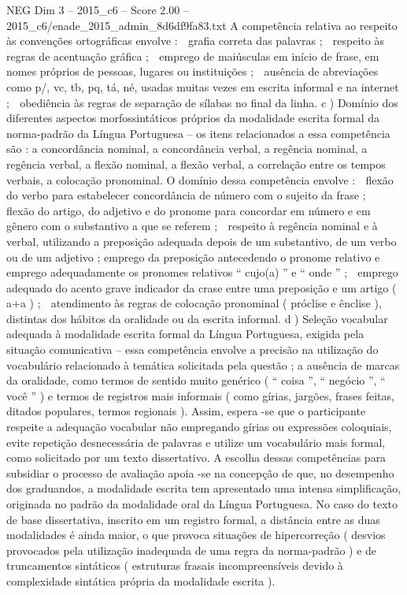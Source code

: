 \begin{textsample}{NEG Dim 3 – 2015\_c6 – Score 2.00 – 2015\_c6/enade\_2015\_admin\_8d6df9fa83.txt}
A competência relativa ao respeito às convenções ortográficas envolve :  grafia correta das palavras ;  respeito às regras de acentuação gráfica ;  emprego de maiúsculas em início de frase, em nomes próprios de pessoas, lugares ou instituições ;  ausência de abreviações como p/, vc, tb, pq, tá, né, usadas muitas vezes em escrita informal e na internet ;  obediência às regras de separação de sílabas no final da linha. c ) Domínio dos diferentes aspectos morfossintáticos próprios da modalidade escrita formal da norma-padrão da Língua Portuguesa – os itens relacionados a essa competência são : a concordância nominal, a concordância verbal, a regência nominal, a regência verbal, a flexão nominal, a flexão verbal, a correlação entre os tempos verbais, a colocação pronominal.
O domínio dessa competência envolve :  flexão do verbo para estabelecer concordância de número com o sujeito da frase ;  flexão do artigo, do adjetivo e do pronome para concordar em número e em gênero com o substantivo a que se referem ;  respeito à regência nominal e à verbal, utilizando a preposição adequada depois de um substantivo, de um verbo ou de um adjetivo ; emprego da preposição antecedendo o pronome relativo e emprego adequadamente os pronomes relativos “ cujo(a) ” e “ onde ” ;  emprego adequado do acento grave indicador da crase entre uma preposição e um artigo ( a+a ) ;  atendimento às regras de colocação pronominal ( próclise e ênclise ), distintas dos hábitos da oralidade ou da escrita informal. d ) Seleção vocabular adequada à modalidade escrita formal da Língua Portuguesa, exigida pela situação comunicativa – essa competência envolve a precisão na utilização do vocabulário relacionado à temática solicitada pela questão ; a ausência de marcas da oralidade, como termos de sentido muito genérico ( “ coisa ”, “ negócio ”, “ você ” ) e termos de registros mais informais ( como gírias, jargões, frases feitas, ditados populares, termos regionais ).
Assim, espera -se que o participante respeite a adequação vocabular não empregando gírias ou expressões coloquiais, evite repetição desnecessária de palavras e utilize um vocabulário mais formal, como solicitado por um texto dissertativo.
A escolha dessas competências para subsidiar o processo de avaliação apoia -se na concepção de que, no desempenho dos graduandos, a modalidade escrita tem apresentado uma intensa simplificação, originada no padrão da modalidade oral da Língua Portuguesa.
No caso do texto de base dissertativa, inscrito em um registro formal, a distância entre as duas modalidades é ainda maior, o que provoca situações de hipercorreção ( desvios provocados pela utilização inadequada de uma regra da norma-padrão ) e de truncamentos sintáticos ( estruturas frasais incompreensíveis devido à complexidade sintática própria da modalidade escrita ).

\end{textsample}
